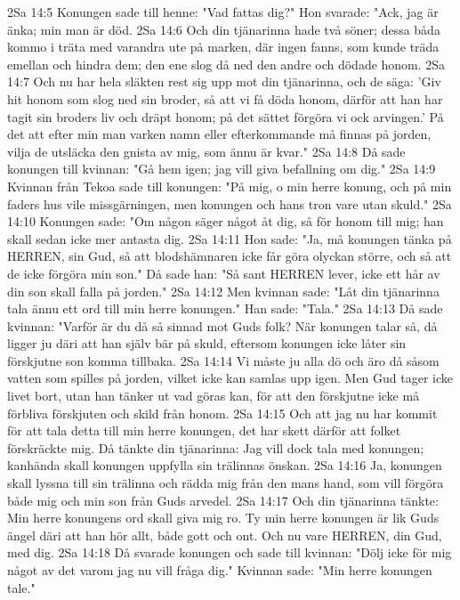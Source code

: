 2Sa 14:5  Konungen sade till henne: "Vad fattas dig?" Hon svarade: "Ack, jag är änka; min man är död.
2Sa 14:6  Och din tjänarinna hade två söner; dessa båda kommo i träta med varandra ute på marken, där ingen fanns, som kunde träda emellan och hindra dem; den ene slog då ned den andre och dödade honom.
2Sa 14:7  Och nu har hela släkten rest sig upp mot din tjänarinna, och de säga: 'Giv hit honom som slog ned sin broder, så att vi få döda honom, därför att han har tagit sin broders liv och dräpt honom; på det sättet förgöra vi ock arvingen.' På det att efter min man varken namn eller efterkommande må finnas på jorden, vilja de utsläcka den gnista av mig, som ännu är kvar."
2Sa 14:8  Då sade konungen till kvinnan: "Gå hem igen; jag vill giva befallning om dig."
2Sa 14:9  Kvinnan från Tekoa sade till konungen: "På mig, o min herre konung, och på min faders hus vile missgärningen, men konungen och hans tron vare utan skuld."
2Sa 14:10  Konungen sade: "Om någon säger något åt dig, så för honom till mig; han skall sedan icke mer antasta dig.
2Sa 14:11  Hon sade: "Ja, må konungen tänka på HERREN, sin Gud, så att blodshämnaren icke får göra olyckan större, och så att de icke förgöra min son." Då sade han: "Så sant HERREN lever, icke ett hår av din son skall falla på jorden."
2Sa 14:12  Men kvinnan sade: "Låt din tjänarinna tala ännu ett ord till min herre konungen." Han sade: "Tala."
2Sa 14:13  Då sade kvinnan: "Varför är du då så sinnad mot Guds folk? När konungen talar så, då ligger ju däri att han själv bär på skuld, eftersom konungen icke låter sin förskjutne son komma tillbaka.
2Sa 14:14  Vi måste ju alla dö och äro då såsom vatten som spilles på jorden, vilket icke kan samlas upp igen. Men Gud tager icke livet bort, utan han tänker ut vad göras kan, för att den förskjutne icke må förbliva förskjuten och skild från honom.
2Sa 14:15  Och att jag nu har kommit för att tala detta till min herre konungen, det har skett därför att folket förskräckte mig. Då tänkte din tjänarinna: Jag vill dock tala med konungen; kanhända skall konungen uppfylla sin trälinnas önskan.
2Sa 14:16  Ja, konungen skall lyssna till sin trälinna och rädda mig från den mans hand, som vill förgöra både mig och min son från Guds arvedel.
2Sa 14:17  Och din tjänarinna tänkte: Min herre konungens ord skall giva mig ro. Ty min herre konungen är lik Guds ängel däri att han hör allt, både gott och ont. Och nu vare HERREN, din Gud, med dig.
2Sa 14:18  Då svarade konungen och sade till kvinnan: "Dölj icke för mig något av det varom jag nu vill fråga dig." Kvinnan sade: "Min herre konungen tale."
